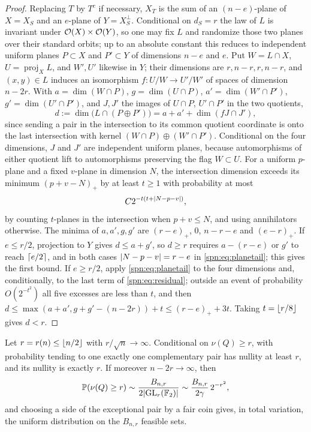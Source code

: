 \begin{proof}
Replacing $T$ by $T^c$ if necessary, $X_T$ is the sum of an $(n-e)$-plane of $X=X_S$ and an
$e$-plane of $Y=X_S^\perp$. Conditional on $d_S=r$ the law of $L$ is invariant under
$\mathcal{O}(X)\times\mathcal{O}(Y)$, so one may fix $L$ and randomize those two planes over their
standard orbits; up to an absolute constant this reduces to independent uniform planes
$P\subset X$ and $P'\subset Y$ of dimensions $n-e$ and $e$. Put $W=L\cap X$, $U=\operatorname{proj}_XL$,
and $W',U'$ likewise in $Y$; their dimensions are $r,n-r,r,n-r$, and $(x,y)\in L$ induces an
isomorphism $f\colon U/W\to U'/W'$ of spaces of dimension $n-2r$. With
$a=\dim(W\cap P)$, $g=\dim(U\cap P)$, $a'=\dim(W'\cap P')$, $g'=\dim(U'\cap P')$, and $J,J'$ the
images of $U\cap P$, $U'\cap P'$ in the two quotients,
\begin{equation}\label{spn:eq:residual}
 d:=\dim\bigl(L\cap(P\oplus P')\bigr)=a+a'+\dim(fJ\cap J'),
\end{equation}
since sending a pair in the intersection to its common quotient coordinate is onto the last
intersection with kernel $(W\cap P)\oplus(W'\cap P')$. Conditional on the four dimensions, $J$ and
$J'$ are independent uniform planes, because automorphisms of either quotient lift to
automorphisms preserving the flag $W\subset U$. For a uniform $p$-plane and a fixed $v$-plane in
dimension $N$, the intersection dimension exceeds its minimum $(p+v-N)_+$ by at least $t\ge1$
with probability at most
\begin{equation}\label{spn:eq:planetail}
 C2^{-t(t+\lvert N-p-v\rvert)},
\end{equation}
by counting $t$-planes in the intersection when $p+v\le N$, and using annihilators otherwise. The
minima of $a,a',g,g'$ are $(r-e)_+$, $0$, $n-r-e$ and $(e-r)_+$. If $e\le r/2$, projection to $Y$
gives $d\le a+g'$, so $d\ge r$ requires $a-(r-e)$ or $g'$ to reach $\lceil e/2\rceil$, and in both cases
$\lvert N-p-v\rvert=r-e$ in \eqref{spn:eq:planetail}; this gives the first bound. If $e\ge r/2$, apply
\eqref{spn:eq:planetail} to the four dimensions and, conditionally, to the last term of
\eqref{spn:eq:residual}; outside an event of probability $O(2^{-t^2})$ all five excesses are less
than $t$, and then $d\le\max(a+a',g+g'-(n-2r))+t\le(r-e)_++3t$. Taking $t=\lfloor r/8\rfloor$ gives
$d<r$.
\end{proof}

\begin{theorem}\label{spn:thm:rare}
Let $r=r(n)\le\lfloor n/2\rfloor$ with $r/\sqrt n\to\infty$. Conditional on $\nu(Q)\ge r$, with
probability tending to one exactly one complementary pair has nullity at least $r$, and its
nullity is exactly $r$. If moreover $n-2r\to\infty$, then
\begin{equation}\label{spn:eq:rare}
 \mathbb{P}(\nu(Q)\ge r)\sim\frac{B_{n,r}}{2\lvert\operatorname{GL}_r(\mathbb{F}_2)\rvert}\sim\frac{B_{n,r}}{2\gamma}\,2^{-r^2},
\end{equation}
and choosing a side of the exceptional pair by a fair coin gives, in total variation, the uniform
distribution on the $B_{n,r}$ feasible sets.
\end{theorem}

